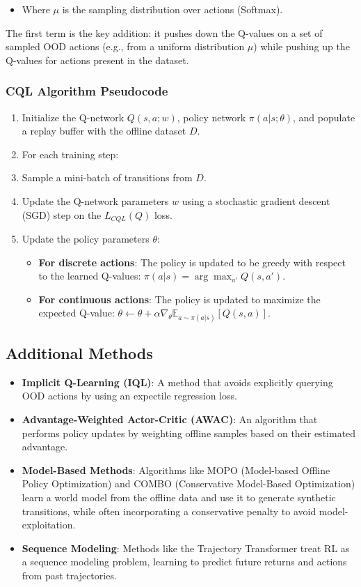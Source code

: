 \documentclass[12pt]{article}
\begin{document}
\begin{itemize}
    \item Where $\mu$ is the sampling distribution over actions (Softmax).
\end{itemize}
The first term is the key addition: it pushes down the Q-values on a set of sampled OOD actions (e.g., from a uniform distribution $\mu$) while pushing up the Q-values for actions present in the dataset.

\subsubsection{CQL Algorithm Pseudocode}
\begin{enumerate}
    \item Initialize the Q-network $Q(s,a; w)$, policy network $\pi(a|s; \theta)$, and populate a replay buffer with the offline dataset $D$.
    \item For each training step:
    \item Sample a mini-batch of transitions from $D$.
    \item Update the Q-network parameters $w$ using a stochastic gradient descent (SGD) step on the $L_{CQL}(Q)$ loss.
    \item Update the policy parameters $\theta$:
    \begin{itemize}
        \item \textbf{For discrete actions}: The policy is updated to be greedy with respect to the learned Q-values: $\pi(a|s) = \arg\max_{a'} Q(s,a')$.
        \item \textbf{For continuous actions}: The policy is updated to maximize the expected Q-value: $\theta \leftarrow \theta + \alpha \nabla_\theta \mathbb{E}_{a \sim \pi(a|s)} [Q(s,a)]$.
    \end{itemize}
\end{enumerate}

\subsection{Additional Methods}
\begin{itemize}
    \item \textbf{Implicit Q-Learning (IQL)}: A method that avoids explicitly querying OOD actions by using an expectile regression loss.
    \item \textbf{Advantage-Weighted Actor-Critic (AWAC)}: An algorithm that performs policy updates by weighting offline samples based on their estimated advantage.
    \item \textbf{Model-Based Methods}: Algorithms like MOPO (Model-based Offline Policy Optimization) and COMBO (Conservative Model-Based Optimization) learn a world model from the offline data and use it to generate synthetic transitions, while often incorporating a conservative penalty to avoid model-exploitation.
    \item \textbf{Sequence Modeling}: Methods like the Trajectory Transformer treat RL as a sequence modeling problem, learning to predict future returns and actions from past trajectories.
\end{itemize}
\end{document}
